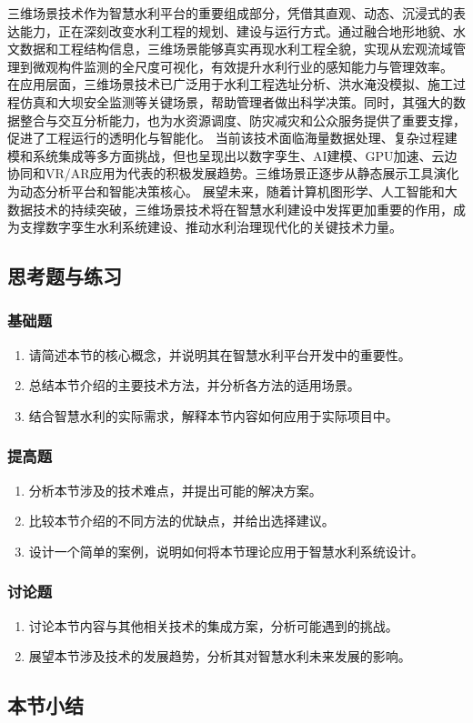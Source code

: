 三维场景技术作为智慧水利平台的重要组成部分，凭借其直观、动态、沉浸式的表达能力，正在深刻改变水利工程的规划、建设与运行方式。通过融合地形地貌、水文数据和工程结构信息，三维场景能够真实再现水利工程全貌，实现从宏观流域管理到微观构件监测的全尺度可视化，有效提升水利行业的感知能力与管理效率。 在应用层面，三维场景技术已广泛用于水利工程选址分析、洪水淹没模拟、施工过程仿真和大坝安全监测等关键场景，帮助管理者做出科学决策。同时，其强大的数据整合与交互分析能力，也为水资源调度、防灾减灾和公众服务提供了重要支撑，促进了工程运行的透明化与智能化。 当前该技术面临海量数据处理、复杂过程建模和系统集成等多方面挑战，但也呈现出以数字孪生、AI建模、GPU加速、云边协同和VR/AR应用为代表的积极发展趋势。三维场景正逐步从静态展示工具演化为动态分析平台和智能决策核心。 展望未来，随着计算机图形学、人工智能和大数据技术的持续突破，三维场景技术将在智慧水利建设中发挥更加重要的作用，成为支撑数字孪生水利系统建设、推动水利治理现代化的关键技术力量。 \subsection{思考题与练习}\label{ux601dux8003ux9898ux4e0eux7ec3ux4e60} \subsubsection{基础题}\label{ux57faux7840ux9898} \begin{enumerate} \def\labelenumi{\arabic{enumi}.} \item 请简述本节的核心概念，并说明其在智慧水利平台开发中的重要性。 \item 总结本节介绍的主要技术方法，并分析各方法的适用场景。 \item 结合智慧水利的实际需求，解释本节内容如何应用于实际项目中。 \end{enumerate} \subsubsection{提高题}\label{ux63d0ux9ad8ux9898} \begin{enumerate} \def\labelenumi{\arabic{enumi}.} \setcounter{enumi}{3} \item 分析本节涉及的技术难点，并提出可能的解决方案。 \item 比较本节介绍的不同方法的优缺点，并给出选择建议。 \item 设计一个简单的案例，说明如何将本节理论应用于智慧水利系统设计。 \end{enumerate} \subsubsection{讨论题}\label{ux8ba8ux8bbaux9898} \begin{enumerate} \def\labelenumi{\arabic{enumi}.} \setcounter{enumi}{6} \item 讨论本节内容与其他相关技术的集成方案，分析可能遇到的挑战。 \item 展望本节涉及技术的发展趋势，分析其对智慧水利未来发展的影响。 \end{enumerate} \subsection{本节小结}\label{ux672cux8282ux5c0fux7ed3} 